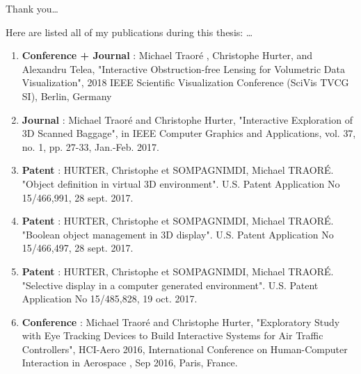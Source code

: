 \documentclass[
11pt, %
english, %
onehalfspacing %
parskip, %
headsepline, %
]{MastersDoctoralThesis} %
\begin{document}

\begin{acknowledgements}
\addchaptertocentry{\acknowledgementname} %
Thank you\ldots
\end{acknowledgements}

\begin{publications}
\addchaptertocentry{\publicationname} %
Here are listed all of my publications during this thesis: \ldots
\begin{enumerate}

\item \textbf{ Conference + Journal} : Michael Traor\'e , Christophe Hurter, and Alexandru Telea, "Interactive Obstruction-free Lensing for Volumetric Data Visualization", 2018 IEEE Scientific Visualization Conference (SciVis  TVCG SI), Berlin, Germany
\item \textbf{ Journal }: Michael Traor\'e and Christophe Hurter, "Interactive Exploration of 3D Scanned Baggage", in IEEE Computer Graphics and Applications, vol. 37, no. 1, pp. 27-33, Jan.-Feb. 2017.
\item \textbf{ Patent } : HURTER, Christophe et SOMPAGNIMDI, Michael TRAORÉ. "Object definition in virtual 3D environment". U.S. Patent Application No 15/466,991, 28 sept. 2017.
\item \textbf{ Patent } : HURTER, Christophe et SOMPAGNIMDI, Michael TRAORÉ. "Boolean object management in 3D display". U.S. Patent Application No 15/466,497, 28 sept. 2017.
\item \textbf{ Patent } : HURTER, Christophe et SOMPAGNIMDI, Michael TRAORÉ. "Selective display in a computer generated environment". U.S. Patent Application No 15/485,828, 19 oct. 2017.
\item  \textbf{ Conference} :  Michael Traor\'e and Christophe Hurter, "Exploratory Study with Eye Tracking Devices to Build Interactive Systems for Air Traffic Controllers", HCI-Aero 2016, International Conference on Human-Computer Interaction in Aerospace , Sep 2016, Paris, France.


\end{enumerate}

\end{publications}
\end{document}
